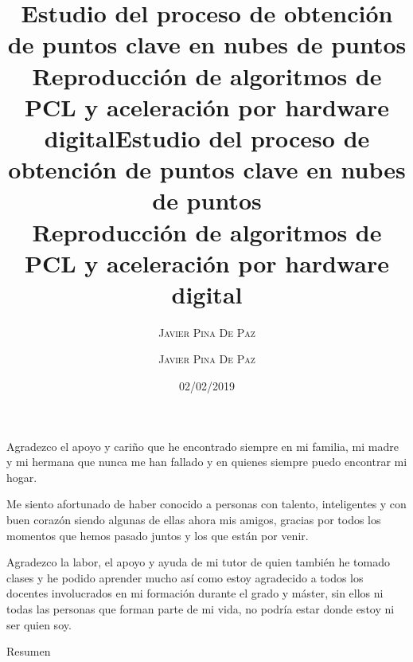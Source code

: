 \documentclass[a4paper,11pt]{book}
\title{\Huge \textbf{Estudio del proceso de obtención de puntos clave en nubes de puntos}   \\ \huge Reproducción de algoritmos de PCL y aceleración por hardware digital}
\author{\textsc{Javier Pina De Paz}} %
\begin{document}
\title{\Huge \textbf{Estudio del proceso de obtención de puntos clave en nubes de puntos}   \\ \huge Reproducción de algoritmos de PCL y aceleración por hardware digital}
\author{\textsc{Javier Pina De Paz}}
\date{02/02/2019} 


\frontmatter
\maketitle

\begin{dedication}
Agradezco el apoyo y cariño que he encontrado siempre en mi familia, mi madre y mi hermana que nunca me han fallado y en quienes siempre puedo encontrar mi hogar. 


Me siento afortunado de haber conocido a personas con talento, inteligentes y con buen corazón siendo algunas de ellas ahora mis amigos, gracias por todos los momentos que hemos pasado juntos y los que están por venir.


Agradezco la labor, el apoyo y ayuda de mi tutor de quien también he tomado clases y he podido aprender mucho así como estoy agradecido a todos los docentes involucrados en mi formación durante el grado y máster, sin ellos ni todas las personas que forman parte de mi vida, no podría estar donde estoy ni ser quien soy.

\end{dedication}



\begin{center}
\Huge{Resumen}
\end{center}
\end{document}
